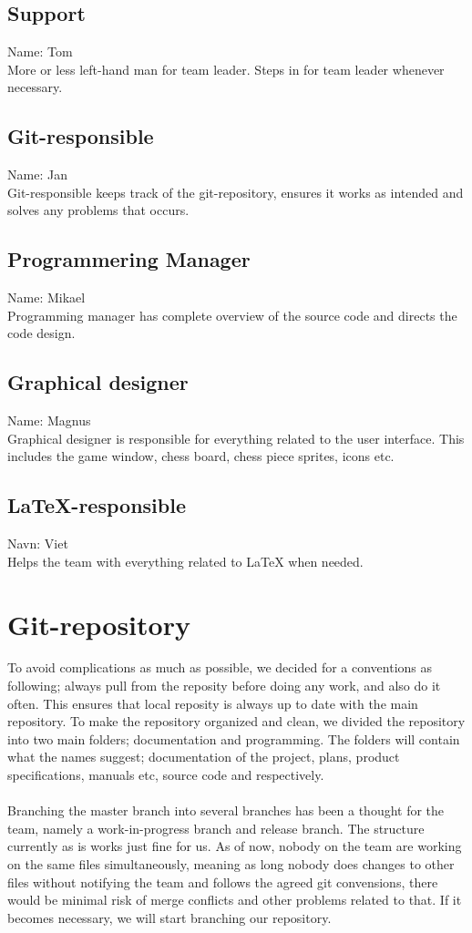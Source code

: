 \documentclass{article}
\begin{document}
\subsection*{Support}
Name: Tom\\
More or less left-hand man for team leader. Steps in for team leader whenever necessary.

\subsection*{Git-responsible}
Name: Jan\\
Git-responsible keeps track of the git-repository, ensures it works as intended and solves any problems that occurs.

\subsection*{Programmering Manager}
Name: Mikael\\
Programming manager has complete overview of the source code and directs the code design.

\subsection*{Graphical designer}
Name: Magnus\\
Graphical designer is responsible for everything related to the user interface. This includes the game window, chess board, chess piece sprites, icons etc.

\subsection*{LaTeX-responsible}
Navn: Viet\\
Helps the team with everything related to LaTeX when needed.

\section*{Git-repository}
To avoid complications as much as possible, we decided for a conventions as following; always pull from the reposity before doing any work, and also do it often. This ensures that local reposity is always up to date with the main repository. To make the repository organized and clean, we divided the repository into two main folders; documentation and programming. The folders will contain what the names suggest; documentation of the project, plans, product specifications, manuals etc, source code and respectively.\\\\
Branching the master branch into several branches has been a thought for the team, namely a work-in-progress branch and release branch. The structure currently as is works just fine for us. As of now, nobody on the team are working on the same files simultaneously, meaning as long nobody does changes to other files without notifying the team and follows the agreed git convensions, there would be minimal risk of merge conflicts and other problems related to that. If it becomes necessary, we will start branching our repository.
\end{document}
